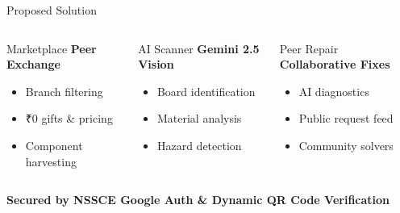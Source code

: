 \documentclass{beamer}
\begin{document}

\begin{frame}{Proposed Solution}

\begin{columns}[T]

\begin{block}{Marketplace}
\small
\textbf{Peer Exchange}
\vspace{0.1cm}
\begin{itemize}
    \item Branch filtering
    \item ₹0 gifts \& pricing
    \item Component harvesting
\end{itemize}
\end{block}

\begin{block}{AI Scanner}
\small
\textbf{Gemini 2.5 Vision}
\vspace{0.1cm}
\begin{itemize}
    \item Board identification
    \item Material analysis
    \item Hazard detection
\end{itemize}
\end{block}

\begin{block}{Peer Repair}
\small
\textbf{Collaborative Fixes}
\vspace{0.1cm}
\begin{itemize}
    \item AI diagnostics
    \item Public request feed
    \item Community solvers
\end{itemize}
\end{block}

\end{columns}

\vspace{0.4cm}
\centering
\small \textbf{Secured by NSSCE Google Auth \& Dynamic QR Code Verification}

\end{frame}

\end{document}
